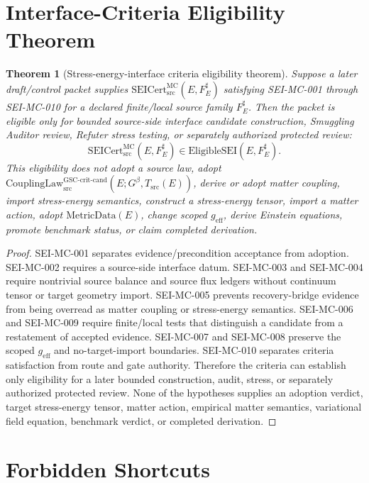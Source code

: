 \documentclass[11pt]{article}
\newcommand{\Gbeta}{G^\beta}
\newcommand{\MetricData}{\mathrm{MetricData}}
\newcommand{\geff}{g_{\mathrm{eff}}}
\newcommand{\CouplingLawCrit}{\mathrm{CouplingLaw}_{\mathrm{src}}^{\mathrm{GSC\mbox{-}crit\mbox{-}cand}}}
\newcommand{\SEICert}{\mathrm{SEICert}_{\mathrm{src}}^{\mathrm{MC}}}
\newcommand{\EligibleSEI}{\mathrm{EligibleSEI}}
\newtheorem{theorem}{Theorem}
\begin{document}
\section{Interface-Criteria Eligibility Theorem}

\begin{theorem}[Stress-energy-interface criteria eligibility theorem]
Suppose a later draft/control packet supplies
\(\SEICert(E,F_E^\sharp)\) satisfying SEI-MC-001 through SEI-MC-010 for a
declared finite/local source family \(F_E^\sharp\). Then the packet is
eligible only for bounded source-side interface candidate construction,
Smuggling Auditor review, Refuter stress testing, or separately authorized
protected review:
\[
  \SEICert(E,F_E^\sharp) \in \EligibleSEI(E,F_E^\sharp).
\]
This eligibility does not adopt a source law, adopt
\(\CouplingLawCrit(E;\Gbeta,T_{\mathrm{src}}(E))\), derive or adopt matter
coupling, import stress-energy semantics, construct a stress-energy tensor,
import a matter action, adopt \(\MetricData(E)\), change scoped \(\geff\),
derive Einstein equations, promote benchmark status, or claim completed
derivation.
\end{theorem}

\begin{proof}
SEI-MC-001 separates evidence/precondition acceptance from adoption. SEI-MC-002
requires a source-side interface datum. SEI-MC-003 and SEI-MC-004 require
nontrivial source balance and source flux ledgers without continuum tensor or
target geometry import. SEI-MC-005 prevents recovery-bridge evidence from
being overread as matter coupling or stress-energy semantics. SEI-MC-006 and
SEI-MC-009 require finite/local tests that distinguish a candidate from a
restatement of accepted evidence. SEI-MC-007 and SEI-MC-008 preserve the
scoped \(\geff\) and no-target-import boundaries. SEI-MC-010 separates
criteria satisfaction from route and gate authority. Therefore the criteria
can establish only eligibility for a later bounded construction, audit, stress,
or separately authorized protected review. None of the hypotheses supplies an
adoption verdict, target stress-energy tensor, matter action, empirical matter
semantics, variational field equation, benchmark verdict, or completed
derivation.
\end{proof}

\section{Forbidden Shortcuts}
\end{document}
